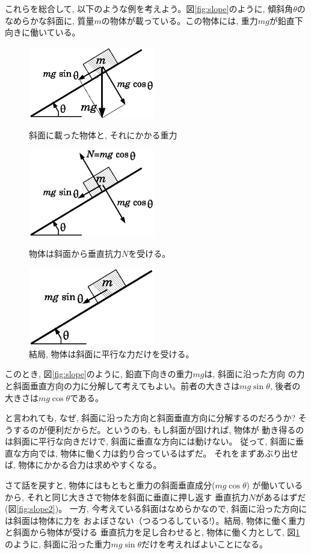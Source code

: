 これらを総合して, 以下のような例を考えよう。図\ref{fig:slope}のように, 
傾斜角$\theta$のなめらかな斜面に, 質量$m$の物体が載っている。この物体には, 
重力$mg$が鉛直下向きに働いている。
\begin{figure}[h]
    \centering
    \includegraphics[width=5.5cm]{slope.eps}
    \caption{斜面に載った物体と, それにかかる重力}\label{fig:slope}

    \centering
    \includegraphics[width=5.5cm]{slope2.eps}
    \caption{物体は斜面から垂直抗力$N$を受ける。}\label{fig:slope2}

    \centering
    \includegraphics[width=5.5cm]{slope3.eps}
    \caption{結局, 物体は斜面に平行な力だけを受ける。}\label{fig:slope3}
\end{figure}

このとき, 図\ref{fig:slope}のように, 鉛直下向きの重力$mg$は, 斜面に沿った方向
の力と斜面垂直方向の力に分解して考えてもよい。前者の大きさは$mg\sin\theta$, 
後者の大きさは$mg\cos\theta$である。

と言われても, なぜ, 斜面に沿った方向と斜面垂直方向に分解するのだろうか?
そうするのが便利だからだ。というのも, もし斜面が固ければ, 物体が
動き得るのは斜面に平行な向きだけで, 斜面に垂直な方向には動けない。
従って, 斜面に垂直な方向では, 物体に働く力は釣り合っているはずだ。
それをまずあぶり出せば, 物体にかかる合力は求めやすくなる。

さて話を戻すと, 物体にはもともと重力の斜面垂直成分($mg\cos\theta$)
が働いているから, それと同じ大きさで物体を斜面に垂直に押し返す
垂直抗力$N$があるはずだ(図\ref{fig:slope2})。
一方, 今考えている斜面はなめらかなので, 斜面に沿った方向には斜面は物体に力を
およぼさない（つるつるしている!）。結局, 物体に働く重力と斜面から物体が受ける
垂直抗力を足し合わせると, 物体に働く力として, 図\ref{fig:slope3}のように, 
斜面に沿った重力$mg \sin \theta$だけを考えればよいことになる。

